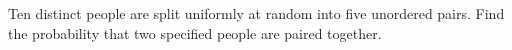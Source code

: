 Ten distinct people are split uniformly at random into five unordered pairs. Find the probability that two specified people are paired together.
